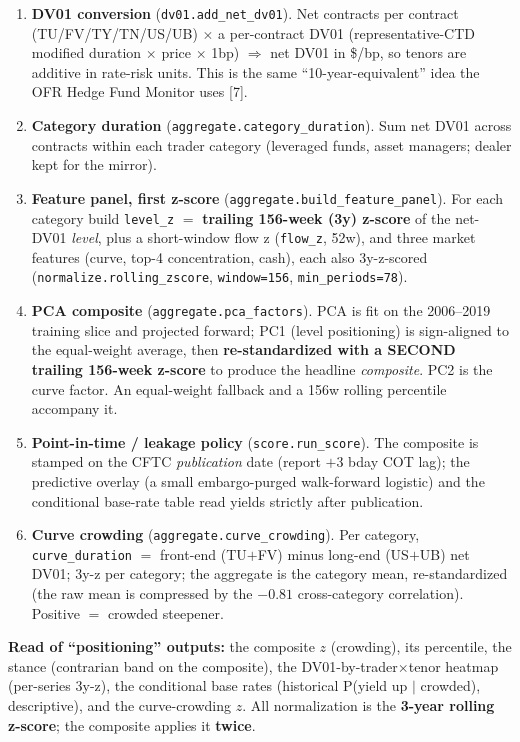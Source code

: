 \documentclass[10pt,a4paper]{article}
\newcommand{\code}[1]{\texttt{\small #1}}
\newcommand{\rf}[1]{{\footnotesize[#1]}}
\begin{document}
\begin{enumerate}[leftmargin=1.4em,itemsep=1pt]
\item \textbf{DV01 conversion} (\code{dv01.add\_net\_dv01}). Net contracts per contract
(TU/FV/TY/TN/US/UB) $\times$ a per-contract DV01 (representative-CTD modified duration $\times$ price
$\times$ 1bp) $\Rightarrow$ net DV01 in \$/bp, so tenors are additive in rate-risk units. This is the
same ``10-year-equivalent'' idea the OFR Hedge Fund Monitor uses \rf{7}.
\item \textbf{Category duration} (\code{aggregate.category\_duration}). Sum net DV01 across contracts
within each trader category (leveraged funds, asset managers; dealer kept for the mirror).
\item \textbf{Feature panel, first z-score} (\code{aggregate.build\_feature\_panel}). For each category
build \code{level\_z} $=$ \textbf{trailing 156-week (3y) z-score} of the net-DV01 \emph{level}, plus a
short-window flow z (\code{flow\_z}, 52w), and three market features (curve, top-4 concentration, cash),
each also 3y-z-scored (\code{normalize.rolling\_zscore}, \code{window=156}, \code{min\_periods=78}).
\item \textbf{PCA composite} (\code{aggregate.pca\_factors}). PCA is fit on the 2006--2019 training slice
and projected forward; PC1 (level positioning) is sign-aligned to the equal-weight average, then
\textbf{re-standardized with a SECOND trailing 156-week z-score} to produce the headline
\emph{composite}. PC2 is the curve factor. An equal-weight fallback and a 156w rolling percentile
accompany it.
\item \textbf{Point-in-time / leakage policy} (\code{score.run\_score}). The composite is stamped on the
CFTC \emph{publication} date (report $+$3 bday COT lag); the predictive overlay (a small embargo-purged
walk-forward logistic) and the conditional base-rate table read yields strictly after publication.
\item \textbf{Curve crowding} (\code{aggregate.curve\_crowding}). Per category, \code{curve\_duration}
$=$ front-end (TU$+$FV) minus long-end (US$+$UB) net DV01; 3y-z per category; the aggregate is the
category mean, re-standardized (the raw mean is compressed by the $-0.81$ cross-category correlation).
Positive $=$ crowded steepener.
\end{enumerate}
\textbf{Read of ``positioning'' outputs:} the composite $z$ (crowding), its percentile, the stance
(contrarian band on the composite), the DV01-by-trader$\times$tenor heatmap (per-series 3y-z), the
conditional base rates (historical P(yield up $\mid$ crowded), descriptive), and the curve-crowding $z$.
All normalization is the \textbf{3-year rolling z-score}; the composite applies it \textbf{twice}.
\end{document}
